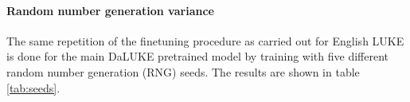 \documentclass[main.tex]{subfiles}
\begin{document}
\paragraph{Random number generation variance}
The same repetition of the finetuning procedure as carried out for English LUKE is done for the main DaLUKE pretrained model by training with five different random number generation (RNG) seeds.
The results are shown in table \ref{tab:seeds}.











\end{document}
